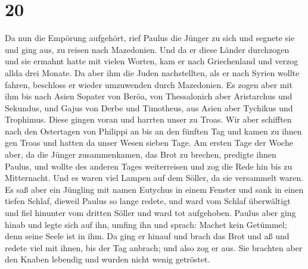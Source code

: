 \hypertarget{section-19}{%
\section{20}\label{section-19}}

 Da nun die Empörung aufgehört, rief Paulus die Jünger zu
sich und segnete sie und ging aus, zu reisen nach Mazedonien.
 Und da er diese Länder durchzogen und sie ermahnt hatte
mit vielen Worten, kam er nach Griechenland und verzog allda drei
Monate.  Da aber ihm die Juden nachstellten, als er nach
Syrien wollte fahren, beschloss er wieder umzuwenden durch Mazedonien.
 Es zogen aber mit ihm bis nach Asien Sopater von Beröa,
von Thessalonich aber Aristarchus und Sekundus, und Gajus von Derbe und
Timotheus, aus Asien aber Tychikus und Trophimus.  Diese
gingen voran und harrten unser zu Troas.  Wir aber
schifften nach den Ostertagen von Philippi an bis an den fünften Tag und
kamen zu ihnen gen Troas und hatten da unser Wesen sieben Tage.
 Am ersten Tage der Woche aber, da die Jünger
zusammenkamen, das Brot zu brechen, predigte ihnen Paulus, und wollte
des anderen Tages weiterreisen und zog die Rede hin bis zu Mitternacht.
 Und es waren viel Lampen auf dem Söller, da sie
versammelt waren.  Es saß aber ein Jüngling mit namen
Eutychus in einem Fenster und sank in einen tiefen Schlaf, dieweil
Paulus so lange redete, und ward vom Schlaf überwältigt und fiel
hinunter vom dritten Söller und ward tot aufgehoben. 
Paulus aber ging hinab und legte sich auf ihn, umfing ihn und sprach:
Machet kein Getümmel; denn seine Seele ist in ihm.  Da
ging er hinauf und brach das Brot und aß und redete viel mit ihnen, bis
der Tag anbrach; und also zog er aus.  Sie brachten aber
den Knaben lebendig und wurden nicht wenig getröstet.

